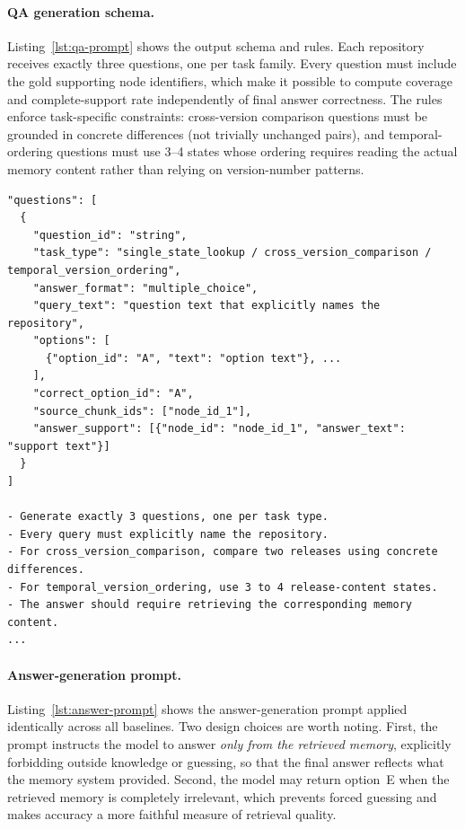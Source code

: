 \paragraph{QA generation schema.}
Listing~\ref{lst:qa-prompt} shows the output schema and rules. Each repository receives exactly three questions, one per task family. Every question must include the gold supporting node identifiers, which make it possible to compute coverage and complete-support rate independently of final answer correctness. The rules enforce task-specific constraints: cross-version comparison questions must be grounded in concrete differences (not trivially unchanged pairs), and temporal-ordering questions must use 3--4 states whose ordering requires reading the actual memory content rather than relying on version-number patterns.

\begin{lstlisting}[caption={Excerpt defining the output schema and QA rules.},label={lst:qa-prompt}]
"questions": [
  {
    "question_id": "string",
    "task_type": "single_state_lookup / cross_version_comparison / temporal_version_ordering",
    "answer_format": "multiple_choice",
    "query_text": "question text that explicitly names the repository",
    "options": [
      {"option_id": "A", "text": "option text"}, ...
    ],
    "correct_option_id": "A",
    "source_chunk_ids": ["node_id_1"],
    "answer_support": [{"node_id": "node_id_1", "answer_text": "support text"}]
  }
]

- Generate exactly 3 questions, one per task type.
- Every query must explicitly name the repository.
- For cross_version_comparison, compare two releases using concrete differences.
- For temporal_version_ordering, use 3 to 4 release-content states.
- The answer should require retrieving the corresponding memory content.
...
\end{lstlisting}

\paragraph{Answer-generation prompt.}
Listing~\ref{lst:answer-prompt} shows the answer-generation prompt applied identically across all baselines. Two design choices are worth noting. First, the prompt instructs the model to answer \emph{only from the retrieved memory}, explicitly forbidding outside knowledge or guessing, so that the final answer reflects what the memory system provided. Second, the model may return option~E when the retrieved memory is completely irrelevant, which prevents forced guessing and makes accuracy a more faithful measure of retrieval quality.


